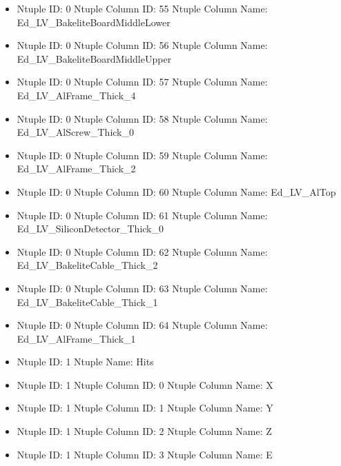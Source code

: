 \documentclass[8pt]{beamer}
\begin{document}
\begin{frame}
\begin{itemize}
        \item Ntuple ID: 0 Ntuple Column ID: 55 Ntuple Column Name: Ed\_LV\_BakeliteBoardMiddleLower
        
        \item Ntuple ID: 0 Ntuple Column ID: 56 Ntuple Column Name: Ed\_LV\_BakeliteBoardMiddleUpper
        
        \item Ntuple ID: 0 Ntuple Column ID: 57 Ntuple Column Name: Ed\_LV\_AlFrame\_Thick\_4
        
        \item Ntuple ID: 0 Ntuple Column ID: 58 Ntuple Column Name: Ed\_LV\_AlScrew\_Thick\_0
        
        \item Ntuple ID: 0 Ntuple Column ID: 59 Ntuple Column Name: Ed\_LV\_AlFrame\_Thick\_2
        
        \item Ntuple ID: 0 Ntuple Column ID: 60 Ntuple Column Name: Ed\_LV\_AlTop
        
        \item Ntuple ID: 0 Ntuple Column ID: 61 Ntuple Column Name: Ed\_LV\_SiliconDetector\_Thick\_0
        
        \item Ntuple ID: 0 Ntuple Column ID: 62 Ntuple Column Name: Ed\_LV\_BakeliteCable\_Thick\_2
        
        \item Ntuple ID: 0 Ntuple Column ID: 63 Ntuple Column Name: Ed\_LV\_BakeliteCable\_Thick\_1
        
        \item Ntuple ID: 0 Ntuple Column ID: 64 Ntuple Column Name: Ed\_LV\_AlFrame\_Thick\_1
        
        \item Ntuple ID: 1 Ntuple Name: Hits
        
        \item Ntuple ID: 1 Ntuple Column ID: 0 Ntuple Column Name: X
        
        \item Ntuple ID: 1 Ntuple Column ID: 1 Ntuple Column Name: Y
        
        \item Ntuple ID: 1 Ntuple Column ID: 2 Ntuple Column Name: Z
        
        \item Ntuple ID: 1 Ntuple Column ID: 3 Ntuple Column Name: E
        
        \end{itemize}
        
            \end{frame}
            
\end{document}

